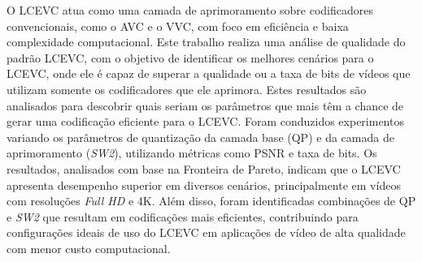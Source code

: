 O \acrfull{LCEVC} atua como uma camada de aprimoramento 
sobre codificadores convencionais, como o \acrfull{AVC} e o \acrfull{VVC}, com foco em eficiência e baixa 
complexidade computacional. 
Este trabalho realiza uma análise de qualidade do padrão \acrshort{LCEVC}, com o objetivo de identificar os
melhores cenários para o \acrshort{LCEVC}, onde ele é capaz de superar a qualidade ou a taxa de bits de vídeos
que utilizam somente os codificadores que ele aprimora. Estes resultados são analisados para descobrir quais 
seriam os parâmetros que mais têm a chance de gerar uma codificação eficiente para o \acrshort{LCEVC}.
Foram conduzidos experimentos variando os parâmetros de quantização da camada base 
(\acrshort{QP}) e da camada de aprimoramento (\textit{SW2}), utilizando métricas como \acrfull{PSNR} e taxa de 
bits. Os resultados, analisados com base na Fronteira de Pareto, indicam que o \acrshort{LCEVC} apresenta 
desempenho superior em diversos cenários, principalmente em vídeos com resoluções \textit{Full HD} e 4K. 
Além disso, foram identificadas combinações de \acrshort{QP} e \textit{SW2} que resultam em codificações 
mais eficientes, contribuindo para configurações ideais de uso do \acrshort{LCEVC} em aplicações de vídeo 
de alta qualidade com menor custo computacional.
